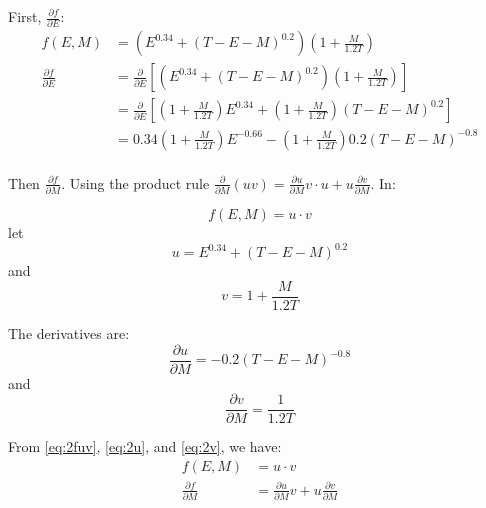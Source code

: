\documentclass{article}
\begin{document}
First, $\frac{\partial f}{\partial E}$:
\begin{equation}\label{eq:2dfde}
  \begin{aligned}
    f(E, M) & = \left( E^{0.34} + \left( T - E - M \right)^{0.2} \right) \left( 1 + \frac{M}{1.2 T} \right) \\
    \frac{\partial f}{\partial E} & = \frac{\partial}{\partial E}\left[\left( E^{0.34} + \left( T - E - M \right)^{0.2} \right) \left( 1 + \frac{M}{1.2 T} \right)\right] \\
    & = \frac{\partial}{\partial E}\left[
      \left( 1 + \frac{M}{1.2 T} \right) E^{0.34} + \left( 1 + \frac{M}{1.2 T} \right) \left( T - E - M \right)^{0.2}
    \right] \\
    & = 0.34\left( 1 + \frac{M}{1.2 T} \right)E^{-0.66} - \left( 1 + \frac{M}{1.2 T} \right)0.2\left( T - E - M \right)^{-0.8} \\
  \end{aligned}
\end{equation}

Then $\frac{\partial f}{\partial M}$. Using the product rule $\frac{\partial}{\partial M}(uv) = \frac{\partial u}{\partial M}v \cdot u + u\frac{\partial v}{\partial M}$. In:

\begin{equation}\label{eq:2fuv}
  f(E, M) = u \cdot v
\end{equation}
let
\begin{equation}\label{eq:2u}
  u = E^{0.34} + \left( T - E - M \right)^{0.2}
\end{equation}
and
\begin{equation}\label{eq:2v}
  v = 1 + \frac{M}{1.2 T}
\end{equation}

The derivatives are:
\begin{equation}\label{eq:2dudm}
  \frac{\partial u}{\partial M} = - 0.2\left( T - E - M \right)^{-0.8}
\end{equation}
and
\begin{equation}\label{eq:2dvdm}
  \frac{\partial v}{\partial M} = \frac{1}{1.2 T}
\end{equation}

From \eqref{eq:2fuv}, \eqref{eq:2u}, and \eqref{eq:2v}, we have:
\begin{equation}
  \begin{split}
    f(E, M) & = u \cdot v \\
    \frac{\partial f}{\partial M} & = \frac{\partial u}{\partial M}v + u\frac{\partial v}{\partial M}
  \end{split}
\end{equation}
\end{document}
